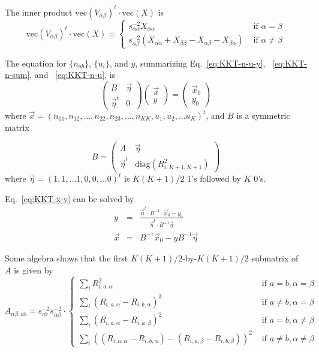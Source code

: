 \documentclass{article}
\newcommand*{\mvec}{\mathbf{\mathrm{vec}}}
\begin{document}
The inner product $\mvec( V_{\alpha\beta})^t \cdot \mvec( X )$ is
\begin{equation}
\mvec( V_{\alpha\beta})^t \cdot \mvec( X ) = \left\{
\begin{array}{cl}
s_{\alpha\alpha}^{-2} X_{\alpha\alpha}   & \text{ if } \alpha = \beta \\
s_{\alpha\beta}^{-2} \left(X_{\alpha\alpha} + X_{\beta\beta} - X_{\alpha\beta} - X_{\beta\alpha}\right) & \text{ if } \alpha \neq \beta
\end{array} \right.
\end{equation}

The equation for $\{n_{ab}\}$, $\{u_i\}$, and $y$, summarizing Eq.~\ref{eq:KKT-n-u-y}, ~\ref{eq:KKT-n-sum}, and ~\ref{eq:KKT-n-u}, is
\begin{equation}
\left(
\begin{array}{cc}
B & \vec{\eta} \\
\vec{\eta}^t & 0 
\end{array}\right)
\left(
\begin{array}{c}
\vec{x} \\
y 
\end{array} \right) = \left(
\begin{array}{c}
\vec{x}_0 \\
y_0 
\end{array}
\right)
\label{eq:KKT-x-y}
\end{equation}
where $\vec{x} = (n_{11}, n_{12}, \dots, n_{22}, n_{23}, \dots, n_{KK}, u_1, u_2,  
\dots u_K)^t$, and $B$ is a symmetric matrix

\begin{equation}
B = \left(
\begin{array}{cc}
A & \vec{\eta} \\
\vec{\eta}^t & \mathrm{diag}( R_{i,K+1,K+1}^2)
\end{array}
\right)
\end{equation}
where $\vec{\eta} = ( 1, 1, ... 1, 0, 0, ... 0 )^t$ is $K(K+1)/2$ 1's
followed by $K$ 0's.

Eq.~\ref{eq:KKT-x-y} can be solved by 
\begin{eqnarray}
y &=& \frac{\vec{\eta}^t\cdot B^{-1}\cdot\vec{x}_0 - y_0}{\vec{\eta}^t\cdot B^{-1} \vec{\eta}} \nonumber \\
\vec{x} &=& B^{-1}\vec{x}_0 - y B^{-1}\vec{\eta}
\end{eqnarray}

Some algebra shows that the first $K(K+1)/2$-by-$K(K+1)/2$ submatrix of $A$ is given by
\begin{equation}
A_{\alpha\beta,ab} = 
s_{ab}^{-2}s_{\alpha\beta}^{-2} \cdot \left\{
\begin{array}{cl}
\sum_i R_{i,a,\alpha}^2 & \text{ if } a=b, \alpha=\beta \\
\sum_i (R_{i,a,\alpha} - R_{i,b,\alpha})^2 & \text{ if } a\neq b, \alpha=\beta \\
\sum_i (R_{i,a,\alpha} - R_{i,a,\beta})^2 & \text{ if } a=b, \alpha\neq\beta \\
\sum_i ((R_{i,a,\alpha} - R_{i,b,\alpha}) - (R_{i,a,\beta} - R_{i,b,\beta}))^2 & \text{ if } a\neq b, \alpha\neq\beta
\end{array}\right.
\end{equation}
\end{document}
